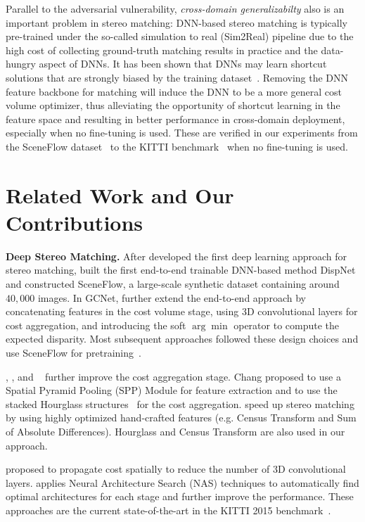 \documentclass[10pt,twocolumn,letterpaper]{article}
\begin{document}
Parallel to the adversarial vulnerability, \textit{cross-domain generalizabilty} also is an important problem in stereo matching: DNN-based stereo matching is typically pre-trained under the so-called simulation to real (Sim2Real) pipeline due to the high cost of collecting ground-truth matching results in practice and the data-hungry aspect of DNNs. It has been shown that DNNs may learn shortcut solutions that are strongly biased by the training dataset~\cite{geirhos2020shortcut}. Removing the DNN feature backbone for matching will induce the DNN to be a more general cost volume optimizer, thus alleviating the opportunity of shortcut learning in the feature space and resulting in better performance in cross-domain deployment, especially when no fine-tuning is used. These are verified in our experiments from the SceneFlow dataset~\cite{dispnet16} to the KITTI benchmark~\cite{Menze2015CVPR} when no fine-tuning is used. 



\section{Related Work and Our Contributions}
\textbf{Deep Stereo Matching.}
After \cite{StereoPatch} developed the first deep learning approach for stereo matching, \cite{dispnet16} built the first end-to-end trainable DNN-based method DispNet and constructed SceneFlow, a large-scale synthetic dataset containing around $40,000$ images. In GCNet, \cite{gcnet2017} further extend the end-to-end approach by concatenating features in the cost volume stage, using 3D convolutional layers for cost aggregation, and introducing the soft $\arg\min$ operator to compute the expected disparity. Most subsequent approaches followed these design choices and use SceneFlow for pretraining~\cite{Menze2015CVPR}. 
 
 
 \cite{chang2018pyramid}, \cite{AMNet}, and ~\cite{GroupWiseStereo} further improve the cost aggregation stage. Chang \etal proposed to use a Spatial Pyramid Pooling (SPP) Module for feature extraction and to use the stacked Hourglass structures~\cite{hourglass_2016} for the cost aggregation. 
 \cite{Yee_2020_WACV} speed up stereo matching by using highly optimized hand-crafted features (e.g. Census Transform and Sum of Absolute Differences). Hourglass and Census Transform are also used in our approach.

 \cite{GANet,SPNetStereo} proposed to propagate cost spatially to reduce the number of 3D convolutional layers. 
 \cite{LEAStereo} applies Neural Architecture Search (NAS) techniques to automatically find optimal architectures for each stage and further improve the performance. These approaches are the current state-of-the-art in the KITTI 2015 benchmark~\cite{Menze2015CVPR}.
\end{document}
